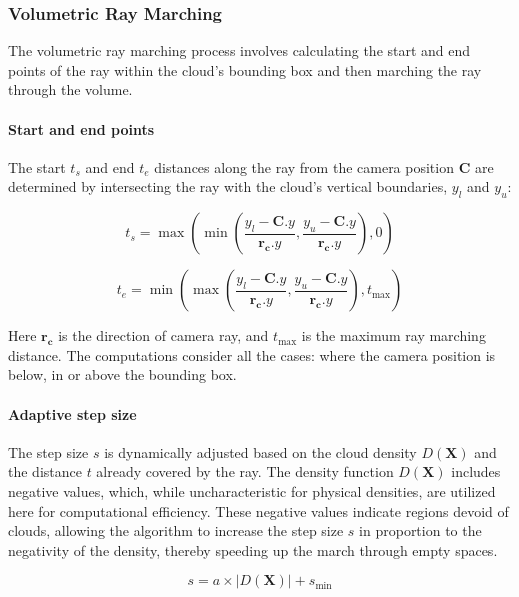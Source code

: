 \subsubsection{Volumetric Ray Marching}

The volumetric ray marching process involves calculating the start and end points of the ray within the cloud's bounding box and then marching the ray through the volume.

\paragraph{Start and end points}

The start $t_s$ and end $t_e$ distances along the ray from the camera position $\mathbf{C}$ are determined by intersecting the ray with the cloud's vertical boundaries, $y_l$ and $y_u$: 

\begin{equation}
    t_s = \max(\min(\frac{y_l - \mathbf{C}.y}{\mathbf{r_c}.y}, \frac{y_u - \mathbf{C}.y}{\mathbf{r_c}.y}), 0)
\end{equation}

\begin{equation}
    t_e = \min(\max(\frac{y_l - \mathbf{C}.y}{\mathbf{r_c}.y}, \frac{y_u - \mathbf{C}.y}{\mathbf{r_c}.y}), t_{\text{max}})
\end{equation}

Here $\mathbf{r_c}$ is the direction of camera ray, and $t_{\text{max}}$ is the maximum ray marching distance. The computations consider all the cases: where the camera position is below, in or above the bounding box.

\paragraph{Adaptive step size}

The step size $s$ is dynamically adjusted based on the cloud density $D(\mathbf{X})$ and the distance $t$ already covered by the ray. The density function $D(\mathbf{X})$ includes negative values, which, while uncharacteristic for physical densities, are utilized here for computational efficiency. These negative values indicate regions devoid of clouds, allowing the algorithm to increase the step size $s$ in proportion to the negativity of the density, thereby speeding up the march through empty spaces.

\begin{equation}
    s = a \times |D(\mathbf{X})| + s_{\text{min}}
\end{equation}

